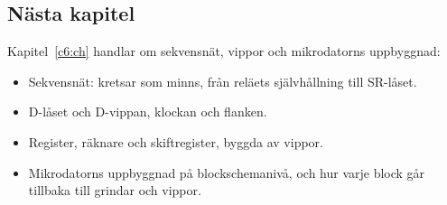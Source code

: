 \subsection*{Nästa kapitel}
Kapitel~\ref{c6:ch} handlar om sekvensnät, vippor och mikrodatorns uppbyggnad:
\begin{itemize}
  \item Sekvensnät: kretsar som minns, från reläets självhållning till SR-låset.
  \item D-låset och D-vippan, klockan och flanken.
  \item Register, räknare och skiftregister, byggda av vippor.
  \item Mikrodatorns uppbyggnad på blockschemanivå, och hur varje block går tillbaka till grindar
    och vippor.
\end{itemize}
